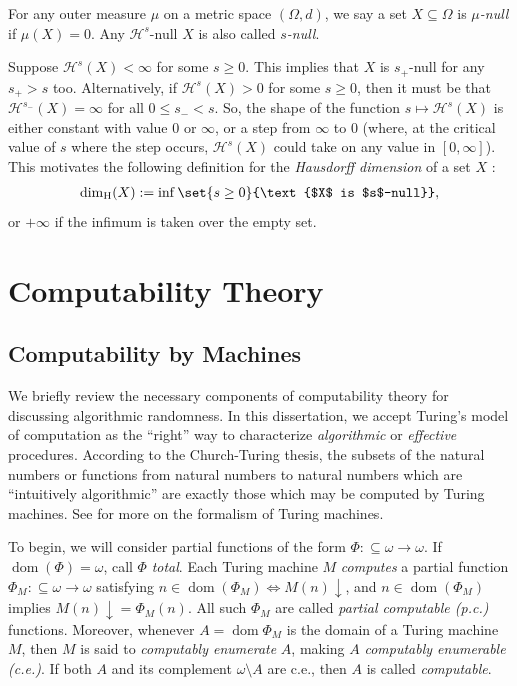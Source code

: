 For any outer measure $\mu$ on a metric space $(\Omega, d)$, we say a set $X \subseteq \Omega$ is \textit{$\mu$-null} if $\mu(X) = 0$. Any $\mathcal{H}^s$-null $X$ is also called \textit{$s$-null}. 

Suppose $\mathcal{H}^s(X) < \infty$ for some $s \geq 0$. This implies that $X$ is $s_+$-null for any $s_+ > s$ too. Alternatively, if $\mathcal{H}^s(X) > 0$ for some $s \geq 0$, then it must be that $\mathcal{H}^{s_-}(X) = \infty$ for all $0 \leq s_- < s$. So, the shape of the function $s \mapsto \mathcal{H}^s(X)$ is either constant with value $0$ or $\infty$, or a step from $\infty$ to $0$ (where, at the critical value of $s$ where the step occurs, $\mathcal{H}^s(X)$ could take on any value in $[0, \infty]$). This motivates the following definition for the \textit{Hausdorff dimension} of a set $X$ \cite{Hau19, Fal90}:
\begin{align}
    \label{equation:definition_of_Hausdorff_dimension}
    \dim_{\operatorname{H}}(X) := \inf\set{s \geq 0}{\text{$X$ is $s$-null}},
\end{align} 
or $+\infty$ if the infimum is taken over the empty set.

\section{Computability Theory} \label{section:Computability_Theory}

\subsection{Computability by Machines}


We briefly review the necessary components of computability theory for discussing algorithmic randomness. In this dissertation, we accept Turing's model of computation as the ``right'' way to characterize \textit{algorithmic} or \textit{effective} procedures. According to the Church-Turing thesis, the subsets of the natural numbers or functions from natural numbers to natural numbers which are ``intuitively algorithmic'' are exactly those which may be computed by Turing machines. See \cite{DH10} for more on the formalism of Turing machines. 

To begin, we will consider partial functions of the form $\Phi : \subseteq \omega \to \omega$. If $\operatorname{dom}(\Phi) = \omega$, call $\Phi$ \textit{total}. Each Turing machine $M$ \textit{computes} a partial function $\Phi_M : \subseteq \omega \to \omega$ satisfying $n \in \operatorname{dom}(\Phi_M) \iff M(n) \downarrow$, and $n \in \operatorname{dom}(\Phi_M)$ implies $M(n) \downarrow= \Phi_M(n)$. All such $\Phi_M$ are called \textit{partial computable (p.c.)} functions. Moreover, whenever $A = \operatorname{dom}\Phi_M$ is the domain of a Turing machine $M$, then $M$ is said to \textit{computably enumerate} $A$, making $A$ \textit{computably enumerable (c.e.)}. If both $A$ and its complement $\omega \setminus A$ are c.e., then $A$ is called \textit{computable}. 

